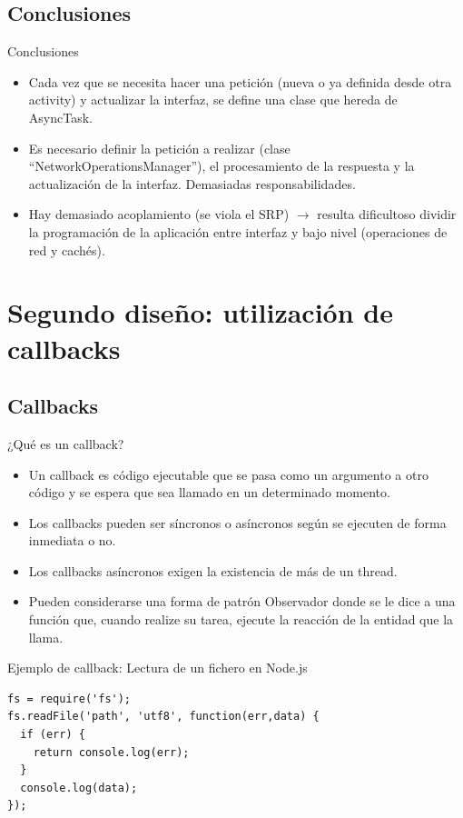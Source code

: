 \documentclass{beamer}
\begin{document}
\subsection{Conclusiones}
\begin{frame}{Conclusiones}
\begin{itemize}
\item Cada vez que se necesita hacer una petición (nueva o ya definida desde otra activity) y actualizar la interfaz, se define una clase que hereda de AsyncTask.
\item Es necesario definir la petición a realizar (clase ``NetworkOperationsManager''), el procesamiento de la respuesta y la actualización de la interfaz. Demasiadas responsabilidades.
\item Hay demasiado acoplamiento (se viola el SRP) $\rightarrow$ resulta dificultoso dividir la programación de la aplicación entre interfaz y bajo nivel (operaciones de red y cachés).
\end{itemize}
\end{frame}

\section{Segundo diseño: utilización de callbacks}
\subsection{Callbacks}
\begin{frame}{¿Qué es un callback?}
\begin{itemize}
\item Un callback es código ejecutable que se pasa como un argumento a otro código y se espera que sea llamado en un determinado momento.
\item Los callbacks pueden ser síncronos o asíncronos según se ejecuten de forma inmediata o no.
\item Los callbacks asíncronos exigen la existencia de más de un thread.
\item Pueden considerarse una forma de patrón Observador donde se le dice a una función que, cuando realize su tarea, ejecute la reacción de la entidad que la llama.
\end{itemize}
\end{frame}

\begin{frame}[fragile]{Ejemplo de callback: Lectura de un fichero en Node.js}
\begin{lstlisting}
fs = require('fs');
fs.readFile('path', 'utf8', function(err,data) {
  if (err) {
    return console.log(err);
  }
  console.log(data);
});
\end{lstlisting}


\end{frame}
\end{document}
